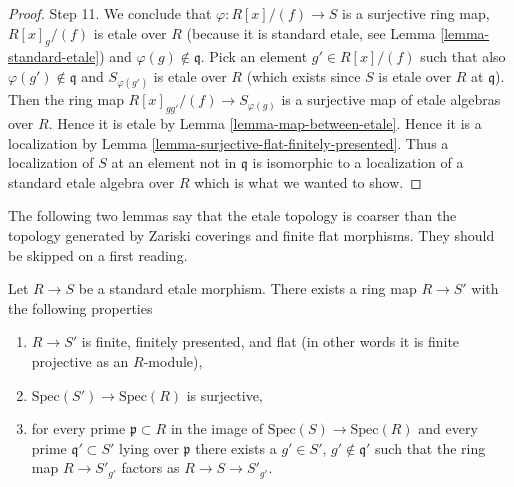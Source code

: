\begin{proof}
\medskip\noindent
Step 11.
We conclude that $\varphi : R[x]/(f) \to S$ is a surjective ring map,
$R[x]_g/(f)$ is etale over $R$ (because it is standard etale,
see Lemma \ref{lemma-standard-etale}) and $\varphi(g) \not \in \mathfrak q$.
Pick an element $g' \in R[x]/(f)$ such that
also $\varphi(g') \not \in \mathfrak q$ and $S_{\varphi(g')}$
is etale over $R$ (which exists since $S$ is etale over $R$ at
$\mathfrak q$). Then the ring map
$R[x]_{gg'}/(f) \to S_{\varphi(g)}$ is a surjective map of etale
algebras over $R$. Hence it is etale by Lemma \ref{lemma-map-between-etale}.
Hence it is a localization by
Lemma \ref{lemma-surjective-flat-finitely-presented}.
Thus a localization of $S$ at an element not in $\mathfrak q$ is
isomorphic to a localization of a standard etale algebra over $R$
which is what we wanted to show.
\end{proof}

\noindent
The following two lemmas say that the etale topology is coarser than the
topology generated by Zariski coverings and finite flat morphisms.
They should be skipped on a first reading.

\begin{lemma}
\label{lemma-standard-etale-finite-flat-Zariski}
Let $R \to S$ be a standard etale morphism.
There exists a ring map $R \to S'$ with the following properties
\begin{enumerate}
\item $R \to S'$ is finite, finitely presented, and flat
(in other words it is finite projective as an $R$-module),
\item $\text{Spec}(S') \to \text{Spec}(R)$ is surjective,
\item for every prime $\mathfrak p \subset R$ in the image of
$\text{Spec}(S) \to \text{Spec}(R)$ and every prime $\mathfrak q' \subset S'$
lying over $\mathfrak p$ there exists a $g' \in S'$, $g' \not \in \mathfrak q'$
such that  the ring map $R \to S'_{g'}$ factors as
$R \to S \to S'_{g'}$.
\end{enumerate}
\end{lemma}

